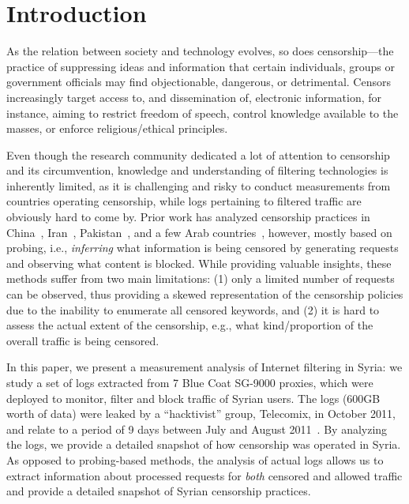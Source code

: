 \documentclass{sig-alternate-2013}
\newcommand{\descr}[1]{\smallskip\noindent{\bf #1}}
\begin{document}
\section{Introduction}
As the relation between society and technology evolves, so does censorship---the practice of suppressing ideas and information that certain individuals, groups or government officials may find objectionable, dangerous, or detrimental.
Censors increasingly target access to, and dissemination of, electronic information, for instance, 
aiming to restrict freedom of speech, control knowledge available to the masses, or enforce religious/ethical principles. 

Even though the research community dedicated a lot of attention to censorship and its circumvention, knowledge and understanding of filtering technologies is inherently limited, as it is challenging and risky to conduct measurements from countries operating censorship, while logs pertaining to filtered traffic are obviously hard to come by.
Prior work has analyzed censorship practices in China~\cite{king2012censorship,knockel2011three,park2010empirical,winter2012great,xu2011internet}, Iran~\cite{anderson2012hidden,aryan2013internet,verkamp2012inferring}, 
Pakistan~\cite{nabi2013anatomy}, and a few Arab countries~\cite{dalek2013method},
however, mostly based on probing, i.e., {\em inferring} what information is being censored by generating requests and observing what content is blocked.  While providing valuable insights, these methods suffer from two main limitations: (1) only a limited number of requests can be observed, thus providing a skewed representation of the censorship policies due to the inability to enumerate all censored keywords, and (2) it is hard to assess the actual extent of the censorship, e.g., 
what kind/proportion of the overall traffic is being censored. 
	

\descr{Roadmap.} In this paper, we present a measurement analysis of Internet filtering in Syria: we study a set of logs extracted from 7 Blue Coat SG-9000 proxies, which were deployed to monitor, filter and block traffic of Syrian users. The logs (600GB worth of data) were leaked by a ``hacktivist'' group, Telecomix, in October 2011, and relate to a period of 9 days between July and August 2011~\cite{leak}.
By analyzing the logs, we provide a detailed snapshot of how censorship was operated in Syria. As opposed to probing-based methods, the analysis of actual logs allows us to extract information about processed requests for \textit{both} censored and allowed traffic and provide a detailed snapshot of Syrian censorship practices. 
\end{document}

